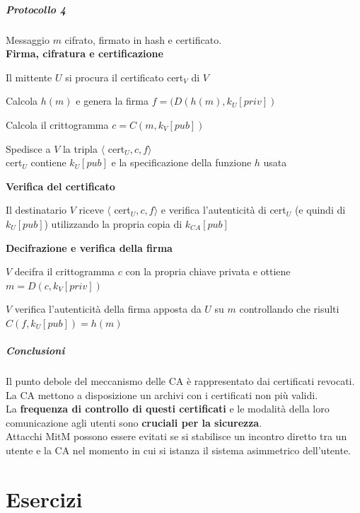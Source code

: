\documentclass[10pt]{book}
\begin{document}
\paragraph{Protocollo 4} Messaggio $m$ cifrato, firmato in hash e certificato.\\
\textbf{Firma, cifratura e certificazione}
\begin{list}{}{}
	\item Il mittente $U$ si procura il certificato cert$_V$ di $V$
	\item Calcola $h(m)$ e genera la firma $f = (D(h(m), k_U[priv])$
	\item Calcola il crittogramma $c = C(m, k_V[pub])$
	\item Spedisce a $V$ la tripla $\langle$ cert$_U, c,f\rangle$\\
cert$_U$ contiene $k_U[pub]$ e la specificazione della funzione $h$ usata	
\end{list}
\textbf{Verifica del certificato}
\begin{list}{}{}
	\item Il destinatario $V$ riceve $\langle$ cert$_U, c,f\rangle$ e verifica l'autenticità di cert$_U$ (e quindi di $k_U[pub]$) utilizzando la propria copia di $k_{CA}[pub]$
\end{list}
\textbf{Decifrazione e verifica della firma}
\begin{list}{}{}
	\item $V$ decifra il crittogramma $c$ con la propria chiave privata e ottiene $m = D(c, k_V[priv])$
	\item $V$ verifica l'autenticità della firma apposta da $U$ su $m$ controllando che risulti $C(f,k_U[pub]) = h(m)$
\end{list}
\paragraph{Conclusioni} Il punto debole del meccanismo delle CA è rappresentato dai certificati revocati. La CA mettono a disposizione un archivi con i certificati non più validi.\\
La \textbf{frequenza di controllo di questi certificati} e le modalità della loro comunicazione agli utenti sono \textbf{cruciali per la sicurezza}.\\
Attacchi MitM possono essere evitati se si stabilisce un incontro diretto tra un utente e la CA nel momento in cui si istanza il sistema asimmetrico dell'utente.
\chapter{Esercizi}
\end{document}
